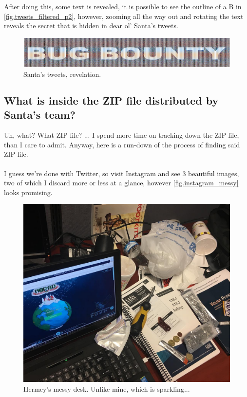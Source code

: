 \documentclass[writeup.tex]{subfiles}
\begin{document}
		After doing this, some text is revealed, it is possible to see the outline of a B in \autoref{fig.tweets_filtered_p2}, however, zooming all the way out and rotating the text reveals the secret that is hidden in dear ol' Santa's tweets.
		
		\begin{figure}[H]
			\centering
			\includegraphics[width=\linewidth]{screenshots/tweets_bug_bounty}
			\caption{Santa's tweets, revelation.}
			\label{fig.tweets_revelation}
		\end{figure}

	\subsection{What is inside the ZIP file distributed by Santa's team?}
		Uh, what? What ZIP file? ... I spend more time on tracking down the ZIP file, than I care to admit. Anyway, here is a run-down of the process of finding said ZIP file.\\
		\\
		I guess we're done with Twitter, so visit Instagram and see 3 beautiful images, two of which I discard more or less at a glance, however \autoref{fig.instagram_messy} looks promising.
		\begin{figure}[H]
			\centering
			\includegraphics[width=.8\linewidth]{images/instagram}
			\caption{Hermey's messy desk. Unlike mine, which is sparkling...}
			\label{fig.instagram_messy}
		\end{figure}
		
\end{document}
